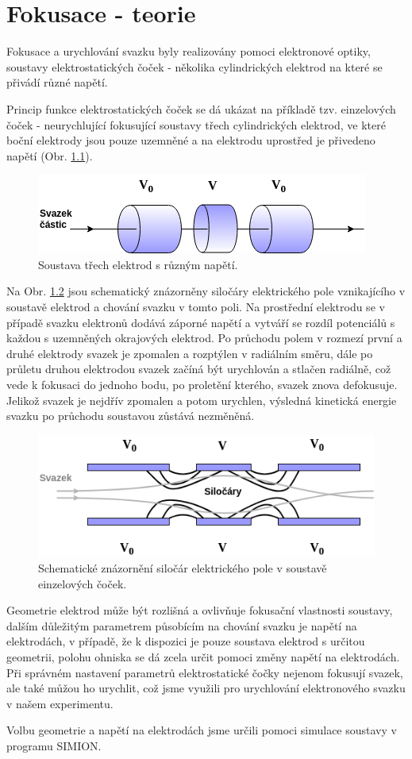 \newpage
\chapter{Fokusace - teorie} 
\label{kapFok}

Fokusace a urychlování svazku byly realizovány pomoci elektronové optiky, soustavy elektrostatických čoček - několika cylindrických elektrod na které se přivádí různé napětí.  

Princip funkce elektrostatických čoček se dá ukázat na příkladě tzv. einzelových čoček - neurychlující fokusující soustavy třech cylindrických elektrod, ve které boční elektrody jsou pouze uzemněné a na elektrodu uprostřed je přivedeno napětí (Obr. \ref{einzel}). 
\begin{figure}[H]
\includegraphics[width=.8\linewidth]{Figure/05/einzel.png}
\caption{Soustava třech elektrod s různým napětí.}
\label{einzel}
\end{figure}

Na Obr. \ref{pole} jsou schematický znázorněny siločáry elektrického pole vznikajícího v soustavě elektrod a chování svazku v tomto poli. Na prostřední elektrodu se v případě svazku elektronů dodává záporné napětí a vytváří se rozdíl potenciálů s každou s uzemněných okrajových elektrod. Po průchodu polem v rozmezí první a druhé elektrody svazek je zpomalen a rozptýlen v radiálním směru, dále po průletu druhou elektrodou svazek začíná být urychlován a stlačen radiálně, což vede k fokusaci do jednoho bodu, po proletění kterého, svazek znova defokusuje. Jelikož svazek je nejdřív zpomalen a potom urychlen, výsledná kinetická energie svazku po průchodu soustavou zůstává nezměněná. 
\begin{figure}[H]
\includegraphics[width=.8\linewidth]{Figure/05/pole.png}
\caption{Schematické znázornění siločár elektrického pole v soustavě einzelových čoček.  }
\label{pole}
\end{figure}

Geometrie elektrod může být rozlišná a ovlivňuje fokusační vlastnosti soustavy, dalším důležitým parametrem působícím na chování svazku je napětí na elektrodách, v případě, že k dispozici je pouze soustava elektrod s určitou geometrii, polohu ohniska se dá zcela určit pomoci změny napětí na elektrodách. Při správném nastavení parametrů elektrostatické čočky nejenom fokusují svazek, ale také můžou ho urychlit, což jsme využili pro urychlování elektronového svazku v našem experimentu. 

Volbu geometrie a napětí na elektrodách jsme určili pomoci simulace soustavy v programu SIMION. 

